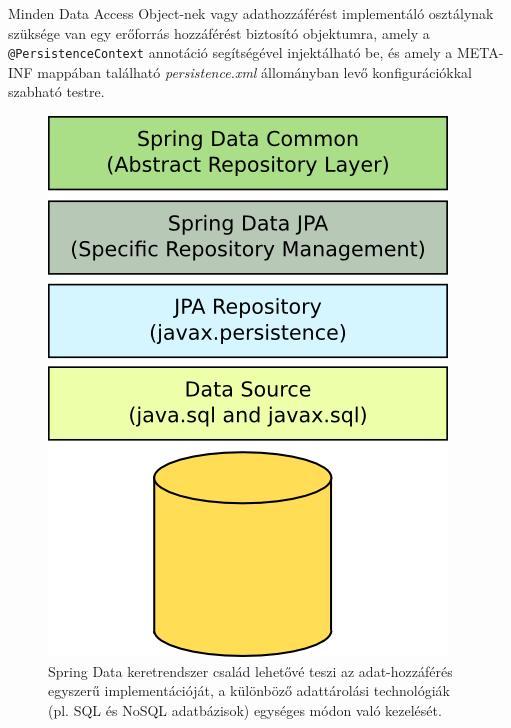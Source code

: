 Minden Data Access Object-nek vagy adathozzáférést implementáló osztálynak szüksége van egy erőforrás hozzáférést biztosító objektumra, amely a \texttt{@PersistenceContext} annotáció segítségével injektálható be, és amely a META-INF mappában található \textsl{persistence.xml} állományban levő konfigurációkkal szabható testre.


 \begin{figure}
  \centering
  \includegraphics[height=0.5\linewidth]{images/SpringDataJPA}
  \caption{ \protect\footnotemark Spring Data keretrendszer család  lehetővé teszi az adat-hozzáférés egyszerű implementációját, a különböző adattárolási technológiák (pl. SQL és NoSQL adatbázisok) egységes módon való kezelését.}
  \label{fig:SpringDataJPA}
\end{figure}

